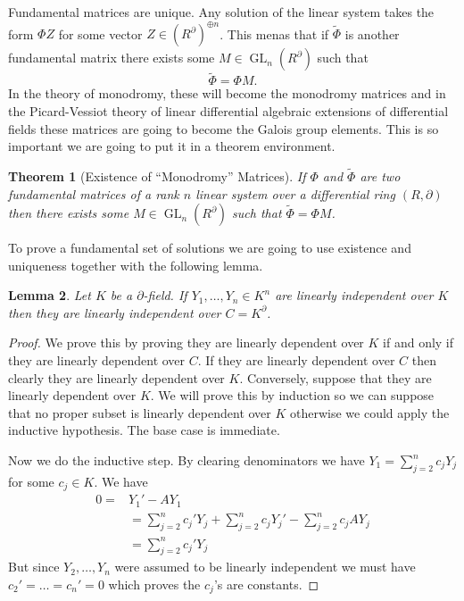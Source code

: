 \documentclass[]{book}
\numberwithin{equation}{section}
\newtheorem{theorem}{Theorem}[subsection]
\newtheorem{lemma}[theorem]{Lemma}
\theoremstyle{definition}
\theoremstyle{remark}
\newcommand{\GL}{\operatorname{GL}}
\begin{document}
Fundamental matrices are unique. 
Any solution of the linear system takes the form $\Phi Z$ for some vector $Z \in (R^{\partial})^{\oplus n}$. 
This menas that if $\widetilde{\Phi}$ is another fundamental matrix there exists some $M \in \GL_n(R^{\partial})$ such that
\begin{equation} \label{E:monodromy-matrix}
  \widetilde{\Phi} = \Phi M.
\end{equation}
In the theory of monodromy, these will become the monodromy matrices and in the Picard-Vessiot theory of linear differential algebraic extensions of differential fields these matrices are going to become the Galois group elements.
This is so important we are going to put it in a theorem environment. 
\begin{theorem}[Existence of ``Monodromy'' Matrices]
	If $\Phi$ and $\widetilde{\Phi}$ are two fundamental matrices of a rank $n$ linear system over a differential ring $(R,\partial)$ then there exists some $M \in \GL_n(R^{\partial})$ such that $\widetilde{\Phi} = \Phi M$.
\end{theorem}

To prove a fundamental set of solutions we are going to use existence and uniqueness together with the following lemma.

\begin{lemma}\label{L:linear-independence}
	Let $K$ be a $\partial$-field. 
	If $Y_1,\ldots,Y_n \in K^n$ are linearly independent over $K$ then they are linearly independent over $C=K^{\partial}$. 
\end{lemma}
\begin{proof}
	We prove this by proving they are linearly dependent over $K$ if and only if they are linearly dependent over $C$.
	If they are linearly dependent over $C$ then clearly they are linearly dependent over $K$. 
	Conversely, suppose that they are linearly dependent over $K$.
	We will prove this by induction so we can suppose that no proper subset is linearly dependent over $K$ otherwise we could apply the inductive hypothesis. 
	The base case is immediate. 
	
	Now we do the inductive step. 
	By clearing denominators we have $Y_1 = \sum_{j=2}^n c_j Y_j$ for some $c_j \in K$.
	We have 
	\begin{align*}
	0=&Y_1'-AY_1 \\
	&= \sum_{j=2}^n c_j' Y_j + \sum_{j=2}^n c_jY_j' - \sum_{j=2}^n c_j AY_j\\
	&= \sum_{j=2}^n c_j' Y_j 
	\end{align*}
	But since $Y_2,\ldots,Y_n$ were assumed to be linearly independent we must have $c_2'=\ldots=c_n'=0$ which proves the $c_j$'s are constants. 
\end{proof}
 
\end{document}
